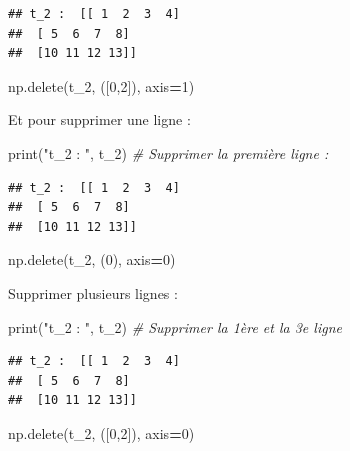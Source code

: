 \documentclass[12pt,]{book}
\newenvironment{Shaded}{\begin{snugshade}}{\end{snugshade}}
\newcommand{\DecValTok}[1]{\textcolor[rgb]{0.00,0.00,0.81}{#1}}
\newcommand{\StringTok}[1]{\textcolor[rgb]{0.31,0.60,0.02}{#1}}
\newcommand{\CommentTok}[1]{\textcolor[rgb]{0.56,0.35,0.01}{\textit{#1}}}
\newcommand{\OperatorTok}[1]{\textcolor[rgb]{0.81,0.36,0.00}{\textbf{#1}}}
\newcommand{\BuiltInTok}[1]{#1}
\newcommand{\NormalTok}[1]{#1}
\numberwithin{equation}{section}
\numberwithin{countremarque}{section}
\begin{document}
\begin{lstlisting}
## t_2 :  [[ 1  2  3  4]
##  [ 5  6  7  8]
##  [10 11 12 13]]
\end{lstlisting}

\begin{Shaded}
\begin{Highlighting}[]
\NormalTok{np.delete(t_2, ([}\DecValTok{0}\NormalTok{,}\DecValTok{2}\NormalTok{]), axis}\OperatorTok{=}\DecValTok{1}\NormalTok{)}
\end{Highlighting}
\end{Shaded}

Et pour supprimer une ligne :

\begin{Shaded}
\begin{Highlighting}[]
\BuiltInTok{print}\NormalTok{(}\StringTok{"t_2 : "}\NormalTok{, t_2)}
\CommentTok{# Supprimer la première ligne :}
\end{Highlighting}
\end{Shaded}

\begin{lstlisting}
## t_2 :  [[ 1  2  3  4]
##  [ 5  6  7  8]
##  [10 11 12 13]]
\end{lstlisting}

\begin{Shaded}
\begin{Highlighting}[]
\NormalTok{np.delete(t_2, (}\DecValTok{0}\NormalTok{), axis}\OperatorTok{=}\DecValTok{0}\NormalTok{)}
\end{Highlighting}
\end{Shaded}

Supprimer plusieurs lignes :

\begin{Shaded}
\begin{Highlighting}[]
\BuiltInTok{print}\NormalTok{(}\StringTok{"t_2 : "}\NormalTok{, t_2)}
\CommentTok{# Supprimer la 1ère et la 3e ligne}
\end{Highlighting}
\end{Shaded}

\begin{lstlisting}
## t_2 :  [[ 1  2  3  4]
##  [ 5  6  7  8]
##  [10 11 12 13]]
\end{lstlisting}

\begin{Shaded}
\begin{Highlighting}[]
\NormalTok{np.delete(t_2, ([}\DecValTok{0}\NormalTok{,}\DecValTok{2}\NormalTok{]), axis}\OperatorTok{=}\DecValTok{0}\NormalTok{)}
\end{Highlighting}
\end{Shaded}
\end{document}
